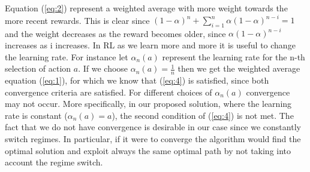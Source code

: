 \documentclass{article}
\begin{document}
Equation (\ref{eq:2}) represent a weighted average with more weight towards the more recent rewards. This is clear since $(1-\alpha)^{n}+\sum_{i=1}^{n} \alpha(1-\alpha)^{n-i}=1$ and the weight decreases as the reward becomes older, since $\alpha(1-\alpha)^{n-i}$ increases as i increases. In RL as we learn more and more it is useful to change the learning rate. For instance let $\alpha_{n}(a)$ represent the learning rate for the n-th selection of action $a$. If we choose $\alpha_{n}(a)=\frac{1}{n}$ then we get the weighted average equation (\ref{eq:1}), for which we know that (\ref{eq:4}) is satisfied, since both convergence criteria are satisfied. For different choices of $\alpha_{n}(a)$ convergence may not occur. More specifically, in our proposed solution, where the learning rate is constant ($\alpha_{n}(a) = a$), the second condition of (\ref{eq:4}) is not met. The fact that we do not have convergence is desirable in our case since we constantly switch regimes. In particular, if it were to converge the algorithm would find the optimal solution and exploit always the same optimal path by not taking into account the regime switch.




\end{document}
